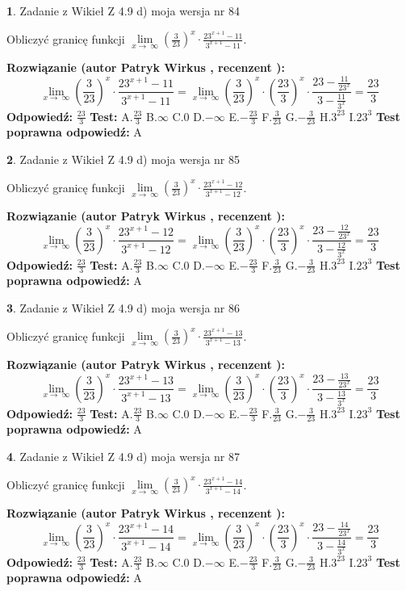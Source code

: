 \documentclass[12pt, a4paper]{article}
\theoremstyle{definition} %
\newtheorem{zad}{}
\newcommand{\zadStart}[1]{\begin{zad}#1\newline}
\newcommand{\zadStop}{\end{zad}}
\newcommand{\rozwStart}[2]{\noindent \textbf{Rozwiązanie (autor #1 , recenzent #2): }\newline}
\newcommand{\rozwStop}{\newline}
\newcommand{\odpStart}{\noindent \textbf{Odpowiedź:}\newline}
\newcommand{\odpStop}{\newline}
\newcommand{\testStart}{\noindent \textbf{Test:}\newline}
\newcommand{\testStop}{\newline}
\newcommand{\kluczStart}{\noindent \textbf{Test poprawna odpowiedź:}\newline}
\newcommand{\kluczStop}{\newline}
\begin{document}
\zadStart{Zadanie z Wikieł Z 4.9 d) moja wersja nr 84}


Obliczyć granicę funkcji  $\lim\limits_{x\to\ \infty}(\frac{3}{23})^{x}\cdot\frac{23^{x+1}-11}{3^{x+1}-11}$.
\zadStop
\rozwStart{Patryk Wirkus}{}
$$\lim\limits_{x\to\ \infty}(\frac{3}{23})^{x}\cdot\frac{23^{x+1}-11}{3^{x+1}-11}=\lim\limits_{x\to\ \infty}(\frac{3}{23})^{x}\cdot(\frac{23}{3})^{x} \cdot \frac{23-\frac{11}{23^{x}}}{3-\frac{11}{3^{x}}} = \frac{23}{3}$$
\rozwStop
\odpStart
$\frac{23}{3}$
\odpStop
\testStart
A.$\frac{23}{3}$ B.$\infty$ C.$0$ D.$-\infty$ E.$-\frac{23}{3}$
F.$\frac{3}{23}$ G.$-\frac{3}{23}$
H.$3^{23}$
I.$23^{3}$
\testStop
\kluczStart
A
\kluczStop



\zadStart{Zadanie z Wikieł Z 4.9 d) moja wersja nr 85}


Obliczyć granicę funkcji  $\lim\limits_{x\to\ \infty}(\frac{3}{23})^{x}\cdot\frac{23^{x+1}-12}{3^{x+1}-12}$.
\zadStop
\rozwStart{Patryk Wirkus}{}
$$\lim\limits_{x\to\ \infty}(\frac{3}{23})^{x}\cdot\frac{23^{x+1}-12}{3^{x+1}-12}=\lim\limits_{x\to\ \infty}(\frac{3}{23})^{x}\cdot(\frac{23}{3})^{x} \cdot \frac{23-\frac{12}{23^{x}}}{3-\frac{12}{3^{x}}} = \frac{23}{3}$$
\rozwStop
\odpStart
$\frac{23}{3}$
\odpStop
\testStart
A.$\frac{23}{3}$ B.$\infty$ C.$0$ D.$-\infty$ E.$-\frac{23}{3}$
F.$\frac{3}{23}$ G.$-\frac{3}{23}$
H.$3^{23}$
I.$23^{3}$
\testStop
\kluczStart
A
\kluczStop



\zadStart{Zadanie z Wikieł Z 4.9 d) moja wersja nr 86}


Obliczyć granicę funkcji  $\lim\limits_{x\to\ \infty}(\frac{3}{23})^{x}\cdot\frac{23^{x+1}-13}{3^{x+1}-13}$.
\zadStop
\rozwStart{Patryk Wirkus}{}
$$\lim\limits_{x\to\ \infty}(\frac{3}{23})^{x}\cdot\frac{23^{x+1}-13}{3^{x+1}-13}=\lim\limits_{x\to\ \infty}(\frac{3}{23})^{x}\cdot(\frac{23}{3})^{x} \cdot \frac{23-\frac{13}{23^{x}}}{3-\frac{13}{3^{x}}} = \frac{23}{3}$$
\rozwStop
\odpStart
$\frac{23}{3}$
\odpStop
\testStart
A.$\frac{23}{3}$ B.$\infty$ C.$0$ D.$-\infty$ E.$-\frac{23}{3}$
F.$\frac{3}{23}$ G.$-\frac{3}{23}$
H.$3^{23}$
I.$23^{3}$
\testStop
\kluczStart
A
\kluczStop



\zadStart{Zadanie z Wikieł Z 4.9 d) moja wersja nr 87}


Obliczyć granicę funkcji  $\lim\limits_{x\to\ \infty}(\frac{3}{23})^{x}\cdot\frac{23^{x+1}-14}{3^{x+1}-14}$.
\zadStop
\rozwStart{Patryk Wirkus}{}
$$\lim\limits_{x\to\ \infty}(\frac{3}{23})^{x}\cdot\frac{23^{x+1}-14}{3^{x+1}-14}=\lim\limits_{x\to\ \infty}(\frac{3}{23})^{x}\cdot(\frac{23}{3})^{x} \cdot \frac{23-\frac{14}{23^{x}}}{3-\frac{14}{3^{x}}} = \frac{23}{3}$$
\rozwStop
\odpStart
$\frac{23}{3}$
\odpStop
\testStart
A.$\frac{23}{3}$ B.$\infty$ C.$0$ D.$-\infty$ E.$-\frac{23}{3}$
F.$\frac{3}{23}$ G.$-\frac{3}{23}$
H.$3^{23}$
I.$23^{3}$
\testStop
\kluczStart
A
\kluczStop
\end{document}
